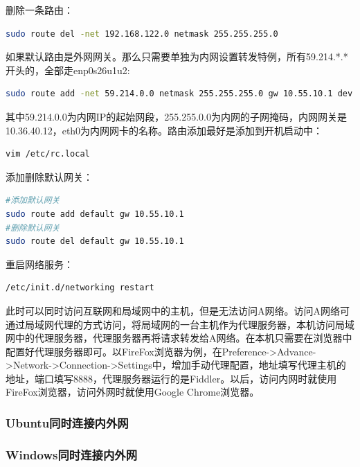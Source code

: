 \documentclass[letter]{book}
\begin{document}
删除一条路由：

\begin{lstlisting}[language=Bash]
sudo route del -net 192.168.122.0 netmask 255.255.255.0
\end{lstlisting}

如果默认路由是外网网关。那么只需要单独为内网设置转发特例，所有59.214.*.*开头的，全部走enp0s26u1u2:

\begin{lstlisting}[language=Bash]
sudo route add -net 59.214.0.0 netmask 255.255.255.0 gw 10.55.10.1 dev enp0s26u1u2
\end{lstlisting}

其中59.214.0.0为内网IP的起始网段，255.255.0.0为内网的子网掩码，内网网关是10.36.40.12，eth0为内网网卡的名称。路由添加最好是添加到开机启动中：

\begin{lstlisting}[language=Bash]
vim /etc/rc.local
\end{lstlisting}

添加删除默认网关：

\begin{lstlisting}[language=Bash]
#添加默认网关
sudo route add default gw 10.55.10.1
#删除默认网关
sudo route del default gw 10.55.10.1
\end{lstlisting}

重启网络服务：

\begin{lstlisting}[language=Bash]
/etc/init.d/networking restart
\end{lstlisting}

此时可以同时访问互联网和局域网中的主机，但是无法访问A网络。访问A网络可通过局域网代理的方式访问，将局域网的一台主机作为代理服务器，本机访问局域网中的代理服务器，代理服务器再将请求转发给A网络。在本机只需要在浏览器中配置好代理服务器即可。以FireFox浏览器为例，在Preference->Advance->Network->Connection->Settings中，增加手动代理配置，地址填写代理主机的地址，端口填写8888，代理服务器运行的是Fiddler。以后，访问内网时就使用FireFox浏览器，访问外网时就使用Google Chrome浏览器。


\subsubsection{Ubuntu同时连接内外网}

\subsubsection{Windows同时连接内外网}
\end{document}

